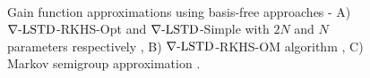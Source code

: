 \begin{figure}[htbp]
	\centering
	\mbox{
		\label{fig:A}
	}
	\mbox{
	}
	\mbox{
	} 
	\caption[$\gradTD$-RKHS algorithms performance comparison]{Gain function approximations using basis-free approaches - A) $\gradTD$-RKHS-Opt and $\gradTD$-Simple with $2N$ and $N$ parameters respectively \cite{radmey18a}, B) $\gradTD$-RKHS-OM algorithm \cite{radmey19}, C) Markov semigroup approximation \cite{tagmeh16}.}
	\label{fig:diff_td_rkhs_coif}
\end{figure}
